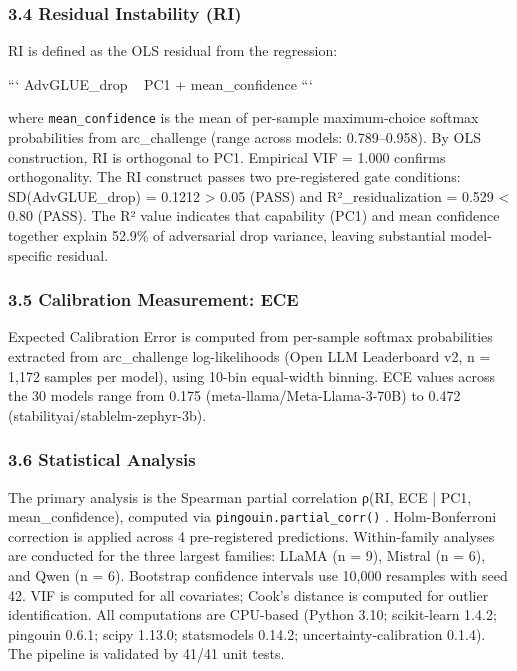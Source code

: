 \subsubsection{3.4 Residual Instability (RI)}

RI is defined as the OLS residual from the regression:

```
AdvGLUE_drop ~ PC1 + mean_confidence
```

where \texttt{mean_confidence} is the mean of per-sample maximum-choice softmax probabilities from arc_challenge (range across models: 0.789–0.958). By OLS construction, RI is orthogonal to PC1. Empirical VIF = 1.000 confirms orthogonality. The RI construct passes two pre-registered gate conditions: SD(AdvGLUE_drop) = 0.1212 > 0.05 (PASS) and R²_residualization = 0.529 < 0.80 (PASS). The R² value indicates that capability (PC1) and mean confidence together explain 52.9\% of adversarial drop variance, leaving substantial model-specific residual.

\subsubsection{3.5 Calibration Measurement: ECE}

Expected Calibration Error is computed from per-sample softmax probabilities extracted from arc_challenge log-likelihoods (Open LLM Leaderboard v2, n = 1,172 samples per model), using 10-bin equal-width binning. ECE values across the 30 models range from 0.175 (meta-llama/Meta-Llama-3-70B) to 0.472 (stabilityai/stablelm-zephyr-3b).

\subsubsection{3.6 Statistical Analysis}

The primary analysis is the Spearman partial correlation ρ(RI, ECE | PC1, mean_confidence), computed via \texttt{pingouin.partial_corr()} \citep{Vallat2018}. Holm-Bonferroni correction is applied across 4 pre-registered predictions. Within-family analyses are conducted for the three largest families: LLaMA (n = 9), Mistral (n = 6), and Qwen (n = 6). Bootstrap confidence intervals use 10,000 resamples with seed 42. VIF is computed for all covariates; Cook's distance is computed for outlier identification. All computations are CPU-based (Python 3.10; scikit-learn 1.4.2; pingouin 0.6.1; scipy 1.13.0; statsmodels 0.14.2; uncertainty-calibration 0.1.4). The pipeline is validated by 41/41 unit tests.

